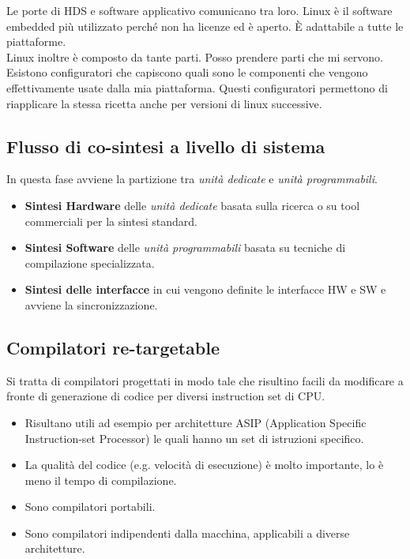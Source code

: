 \documentclass[a4paper]{article}
\theoremstyle{definition}
\begin{document}
			Le porte di HDS e software applicativo comunicano tra loro. Linux è il software embedded più utilizzato perché non ha licenze ed è aperto. È adattabile a tutte le piattaforme.\\
			Linux inoltre è composto da tante parti. Posso prendere parti che mi servono. Esistono configuratori che capiscono quali sono le componenti che vengono effettivamente usate dalla mia piattaforma. Questi configuratori permettono di riapplicare la stessa ricetta anche per versioni di linux successive.
			
		\subsection{Flusso di co-sintesi a livello di sistema}
			In questa fase avviene la partizione tra \textit{unità dedicate} e \textit{unità programmabili}.
			\begin{itemize}
				\item \textbf{Sintesi Hardware} delle \textit{unità dedicate} basata sulla ricerca o su tool commerciali per la sintesi standard.
				\item \textbf{Sintesi Software} delle \textit{unità programmabili} basata su tecniche di compilazione specializzata.
				\item \textbf{Sintesi delle interfacce} in cui vengono definite le interfacce HW e SW e avviene la sincronizzazione.
			\end{itemize}
			
		\subsection{Compilatori re-targetable}
			Si tratta di compilatori progettati in modo tale che risultino facili da modificare a fronte di generazione di codice per diversi instruction set di CPU. 
			\begin{itemize}
				\item Risultano utili ad esempio per architetture ASIP (Application Specific Instruction-set Processor) le quali hanno un set di istruzioni specifico.
				\item La qualità del codice (e.g. velocità di esecuzione) è molto importante, lo è meno il tempo di compilazione.
				\item Sono compilatori portabili.
				\item Sono compilatori indipendenti dalla macchina, applicabili a diverse architetture.
			\end{itemize}
			
\end{document}
